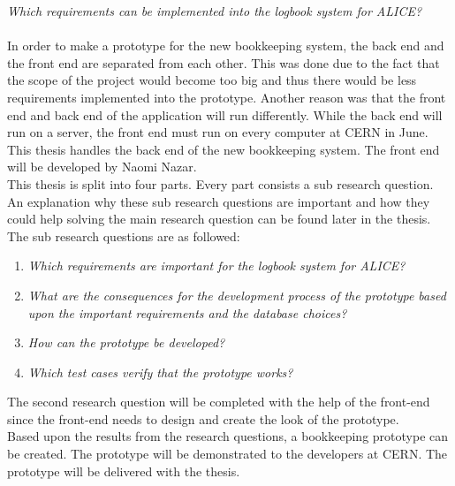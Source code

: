 \documentclass[paper=a4, fontsize=11pt,twoside]{scrartcl}	%
\begin{document}
\textit{Which requirements can be implemented into the logbook system for ALICE?}
\\ \\
In order to make a prototype for the new bookkeeping system, the back end and the front end are separated from each other. This was done due to the fact that the scope of the project would become too big and thus there would be less requirements implemented into the prototype. Another reason was that the front end and back end of the application will run differently. While the back end will run on a server, the front end must run on every computer at CERN in June. This thesis handles the back end of the new bookkeeping system. The front end will be developed by Naomi Nazar.
\\ 
This thesis is split into four parts. Every part consists a sub research question. An explanation why these sub research questions are important and how they could help solving the main research question can be found later in the thesis. The sub research questions are as followed: \\
\begin{enumerate}
\item \textit{Which requirements are important for the logbook system for ALICE?}
\item \textit{What are the consequences for the development process of the prototype based upon the important requirements and the database choices?}
\item \textit{How can the prototype be developed?}
\item \textit{Which test cases verify that the prototype works?}
\end{enumerate}
The second research question will be completed with the help of the front-end since the front-end needs to design and create the look of the prototype. \\
Based upon the results from the research questions, a bookkeeping prototype can be created. The prototype will be demonstrated to the developers at CERN. The prototype will be delivered with the thesis. 

 


\end{document}
